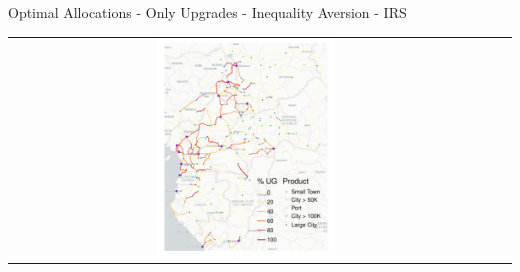 \documentclass[aspectratio=169,xcolor=dvipsnames]{beamer}
\begin{document}
\begin{frame}[label=IOU_IRS_IA]{Optimal Allocations - Only Upgrades - Inequality Aversion - IRS \quad \hyperlink{IOU_IA}{}}
\begin{adjustbox}{center}
\begin{tabular}{@{}c@{}|@{}c@{}|@{}c@{}}
\includegraphics[width=0.38\textwidth, trim= {0.9cm 0 0.9cm 0}, clip]{"../figures/GE/trans_africa_network_GE_20g_4b_fixed_cgc_irs_sigma3.8_rho2_julia_MACR_90kmh_google_perc_ug.pdf"}  
\end{tabular}
\end{adjustbox}
\end{frame}
\end{document}
